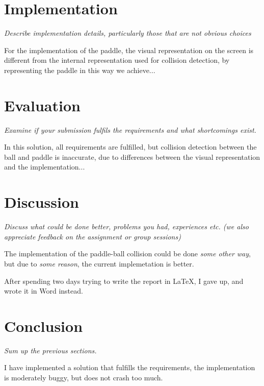 \documentclass[11pt]{article}
\begin{document}
\section{Implementation}

\emph{Describe implementation details, particularly those that are not obvious choices}

For the implementation of the paddle, the visual representation on the screen is different from the internal representation used for collision detection, by representing the paddle in this way we achieve... 


\section{Evaluation}

\emph{Examine if your submission fulfils the requirements and what shortcomings exist.}

In this solution, all requirements are fulfilled, but collision detection between the ball and paddle is inaccurate, due to differences between the visual representation and the implementation...

\section{Discussion}

\emph{Discuss what could be done better, problems you had, experiences etc. (we also appreciate feedback on the assignment or group sessions) }

The implementation of the paddle-ball collision could be done \emph{some other way}, but due to \emph{some reason}, the current implemetation is better.

After spending two days trying to write the report in \LaTeX, I gave up, and wrote it in Word instead.

\section{Conclusion}

\emph{Sum up the previous sections.}

I have implemented a solution that fulfills the requirements, the implementation is moderately buggy, but does not crash too much.




\end{document}
